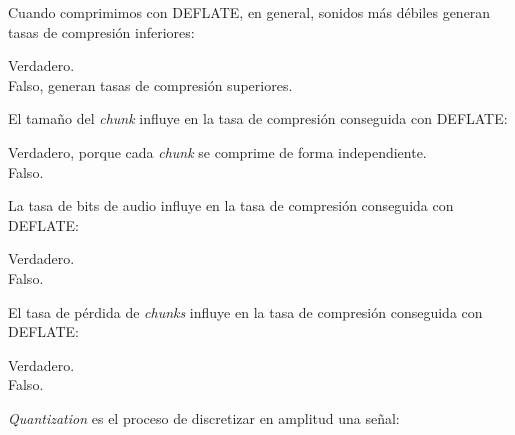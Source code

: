 \documentclass[legalpaper, 12pt, addpoints]{exam}
\begin{document}
\begin{questions}
\question Cuando comprimimos con DEFLATE, en general, sonidos más
débiles generan tasas de compresión inferiores:

\begin{oneparchoices}
  \choice Verdadero.\\
  \choice Falso, generan tasas de compresión superiores.
\end{oneparchoices}
  
\vspace{0.10in}

\question El tamaño del \emph{chunk} influye en la tasa de compresión
conseguida con DEFLATE:

\begin{oneparchoices}
  \choice Verdadero, porque cada \emph{chunk} se comprime de forma independiente.\\
  \choice Falso.
\end{oneparchoices}
  
\vspace{0.10in}

\question La tasa de bits de audio influye en la tasa de compresión
conseguida con DEFLATE:

\begin{oneparchoices}
  \choice Verdadero.\\
  \choice Falso.
\end{oneparchoices}
  
\vspace{0.10in}

\question El tasa de pérdida de \emph{chunks} influye en la tasa de
compresión conseguida con DEFLATE:

\begin{oneparchoices}
  \choice Verdadero.\\
  \choice Falso.
\end{oneparchoices}
  
\vspace{0.10in}


  
\vspace{0.10in}

\question \emph{Quantization} es el proceso de discretizar en amplitud una señal:


\end{questions}
\end{document}

